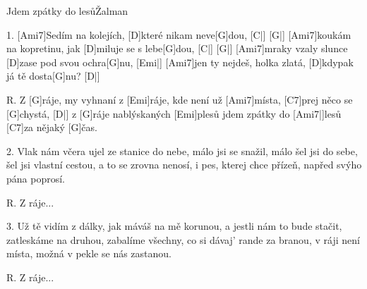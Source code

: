 \begin{song}{Jdem zpátky do lesů}{Žalman}

\begin{xverse}{1. }
[Ami7]Sedím na kolejích, [D]které nikam neve[G]dou, [C|]{} [G|]{}
[Ami7]koukám na kopretinu, jak [D]miluje se s lebe[G]dou, [C|]{} [G|]{}
[Ami7]mraky vzaly slunce [D]zase pod svou ochra[G]nu, [Emi|]{}
[Ami7]jen ty nejdeš, holka zlatá, [D]kdypak já tě dosta[G]nu? [D|]{}
\end{xverse}

\begin{xverse}{R. }
Z [G]ráje, my vyhnaní z [Emi]ráje,
kde není už [Ami7]místa, [C7]prej něco se [G]chystá, [D|]{}
z [G]ráje nablýskaných [Emi]plesů
jdem zpátky do [Ami7|]{lesů} [C7]{}za nějaký [G]{}čas.
\end{xverse}

\begin{xverse}{2. }
Vlak nám včera ujel ze stanice do nebe,
málo jsi se snažil, málo šel jsi do sebe,
šel jsi vlastní cestou, a to se zrovna nenosí,
i pes, kterej chce přízeň, napřed svýho pána poprosí.
\end{xverse}

\begin{xverse}{R. }
Z ráje...
\end{xverse}

\begin{xverse}{3. }
Už tě vidím z dálky, jak máváš na mě korunou,
a jestli nám to bude stačit, zatleskáme na druhou,
zabalíme všechny, co si dávaj' rande za branou,
v ráji není místa, možná v pekle se nás zastanou.
\end{xverse}

\begin{xverse}{R. }
Z ráje...
\end{xverse}

\end{song}

